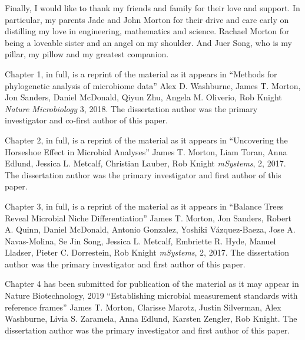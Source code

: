 \begin{frontmatter}
\begin{acknowledgements}
  Finally, I would like to thank my friends and family for their love and support.
  In particular, my parents Jade and John Morton for their drive and care early
  on distilling my love in engineering, mathematics and science.  Rachael Morton
  for being a loveable sister and an angel on my shoulder.  And Juer
  Song, who is my pillar, my pillow and my greatest companion.

  Chapter 1, in full, is a reprint of the material as it appears in
  ``Methods for phylogenetic analysis of microbiome data''
  Alex D. Washburne, James T. Morton, Jon Sanders, Daniel McDonald,
  Qiyun Zhu, Angela M. Oliverio, Rob Knight  \emph{Nature Microbiology} 3, 2018. The dissertation author was the primary investigator and co-first author of this paper.

  Chapter 2, in full, is a reprint of the material as it appears in
  ``Uncovering the Horseshoe Effect in Microbial Analyses''
  James T. Morton, Liam Toran, Anna Edlund, Jessica L. Metcalf,
  Christian Lauber, Rob Knight \emph{mSystems}, 2, 2017.  The dissertation author was the primary investigator and first author of this paper.

  Chapter 3, in full, is a reprint of the material as it appears in
  ``Balance Trees Reveal Microbial Niche Differentiation''
  James T. Morton, Jon Sanders, Robert A. Quinn, Daniel McDonald, Antonio Gonzalez,
  Yoshiki Vázquez-Baeza, Jose A. Navas-Molina, Se Jin Song, Jessica L. Metcalf,
  Embriette R. Hyde, Manuel Lladser, Pieter C. Dorrestein, Rob Knight
  \emph{mSystems}, 2, 2017.  The dissertation author was the primary investigator and first author of this paper.

  Chapter 4 has been submitted for publication of the material as it may appear in
  Nature Biotechnology, 2019 ``Establishing microbial measurement standards with reference frames''
  James T. Morton,  Clarisse Marotz, Justin Silverman, Alex Washburne, Livia S. Zaramela,
  Anna Edlund, Karsten Zengler, Rob Knight. The dissertation author was the primary investigator and first author of this paper.


\end{acknowledgements}


%
%
\begin{vitapage}
\begin{vita}


\end{vita}
\end{vitapage}
\end{frontmatter}
